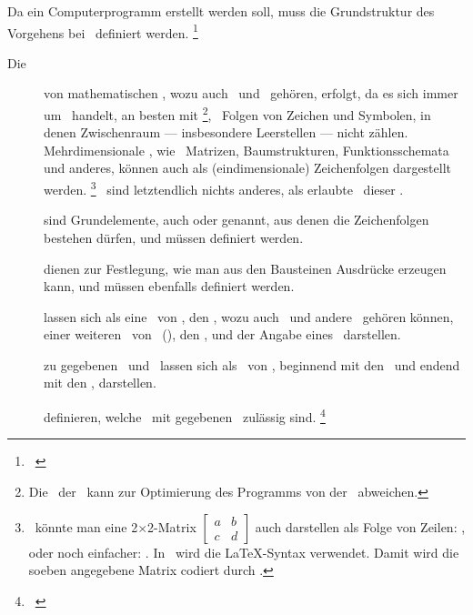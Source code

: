 Da ein Computerprogramm erstellt werden soll, muss die Grundstruktur des Vorgehens bei \Beweisen\ definiert werden.%
\footnote{\seename~\cite{bib:Kalkuel}}

\begin{description}
	\item[Die \logischeDarstellung] von mathematischen \Aussagen, wozu auch \Axiome\ und \Saetze\ gehören, erfolgt, da es sich immer um \Formeln\ handelt, an besten mit \Zeichenfolgen%
	\footnote{%
		Die \interneDarstellung\ der \Zeichenfolgen\ kann zur Optimierung des Programms von der \logischenD\ abweichen.
	},
	\textdh\ Folgen von Zeichen und Symbolen, in denen Zwischenraum --- insbesondere Leerstellen --- nicht zählen.
	Mehrdimensionale \Formeln, wie \textzB\ Matrizen, Baumstrukturen, Funktionsschemata und anderes, können auch als (eindimensionale) Zeichenfolgen dargestellt werden.%
	\footnote{%
		\textZB\ könnte man eine 2$\times$2-Matrix
		$\begin{bmatrix} a & b \\ c & d \end{bmatrix}$
		auch darstellen als Folge von Zeilen: \seqqt{$[(a,b),(c,d)]$}, oder noch einfacher: \seqqt{$[a,b;c,d]$}.
		In \ASBA\ wird die \LaTeX-Syntax verwendet.
		Damit wird die soeben angegebene Matrix codiert durch .
	}
	\Beweise\ sind letztendlich nichts anderes, als erlaubte \Transformationen\ dieser \Zeichenfolgen.
	\item[\Bausteine] sind Grundelemente, auch  oder  genannt, aus denen die Zeichenfolgen bestehen dürfen, und müssen definiert werden.
	\item[\Formationsregeln] dienen zur Festlegung, wie man aus den Bausteinen Ausdrücke erzeugen kann, und müssen ebenfalls definiert werden.
	\item[\Saetze] lassen sich als eine \Menge\ von \Formeln, den \Praemissen, wozu auch \Axiome\ und andere \Saetze\ gehören können, einer weiteren \Menge\ von \Formeln\ (\Zeichenfolgen), den \Konklusionen, und der Angabe eines \Beweises\ darstellen.
	\item[\Beweise] zu gegebenen \Praemissen\ und \Konklusionen\ lassen sich als \Folge\ von \Transformationen, beginnend mit den \Praemissen\ und endend mit den \Konklusionen, darstellen.
	\item[\Transformationsregeln] definieren, welche \Transformationen\ mit gegebenen \Formelmengen\ zulässig sind.%
	\footnote{\seename~\cite{bib:Rautenberg,bib:Schlussregel,bib:NatuerlichesSchliessen}}
\end{description}

\Endchapter
